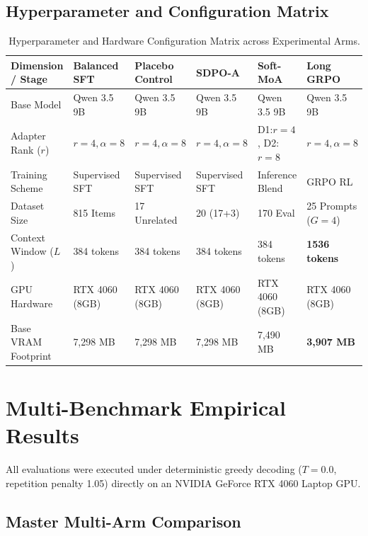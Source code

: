 \documentclass[11pt,a4paper]{article}
\begin{document}
\subsection{Hyperparameter and Configuration Matrix}

\begin{table}[htbp]
\centering
\caption{Hyperparameter and Hardware Configuration Matrix across Experimental Arms.}
\label{tab:config}
\small
\begin{tabular}{@{}llllll@{}}
\toprule
\textbf{Dimension / Stage} & \textbf{Balanced SFT} & \textbf{Placebo Control} & \textbf{SDPO-A} & \textbf{Soft-MoA} & \textbf{Long GRPO} \\
\midrule
Base Model & Qwen 3.5 9B & Qwen 3.5 9B & Qwen 3.5 9B & Qwen 3.5 9B & Qwen 3.5 9B \\
Adapter Rank ($r$) & $r=4, \alpha=8$ & $r=4, \alpha=8$ & $r=4, \alpha=8$ & D1:$r=4$, D2:$r=8$ & $r=4, \alpha=8$ \\
Training Scheme & Supervised SFT & Supervised SFT & Supervised SFT & Inference Blend & GRPO RL \\
Dataset Size & 815 Items & 17 Unrelated & 20 (17+3) & 170 Eval & 25 Prompts ($G=4$) \\
Context Window ($L$) & 384 tokens & 384 tokens & 384 tokens & 384 tokens & \textbf{1536 tokens} \\
GPU Hardware & RTX 4060 (8GB) & RTX 4060 (8GB) & RTX 4060 (8GB) & RTX 4060 (8GB) & RTX 4060 (8GB) \\
Base VRAM Footprint & 7,298 MB & 7,298 MB & 7,298 MB & 7,490 MB & \textbf{3,907 MB} \\
\bottomrule
\end{tabular}
\end{table}

\section{Multi-Benchmark Empirical Results}

All evaluations were executed under deterministic greedy decoding ($T=0.0$, repetition penalty 1.05) directly on an NVIDIA GeForce RTX 4060 Laptop GPU.

\subsection{Master Multi-Arm Comparison}
\end{document}
